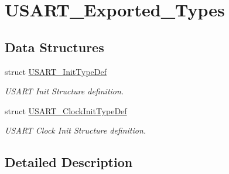 \hypertarget{group___u_s_a_r_t___exported___types}{}\section{U\+S\+A\+R\+T\+\_\+\+Exported\+\_\+\+Types}
\label{group___u_s_a_r_t___exported___types}
\subsection*{Data Structures}
\begin{DoxyCompactItemize}
\item 
struct \mbox{\hyperlink{struct_u_s_a_r_t___init_type_def}{U\+S\+A\+R\+T\+\_\+\+Init\+Type\+Def}}
\begin{DoxyCompactList}\small\item\em U\+S\+A\+RT Init Structure definition. \end{DoxyCompactList}\item 
struct \mbox{\hyperlink{struct_u_s_a_r_t___clock_init_type_def}{U\+S\+A\+R\+T\+\_\+\+Clock\+Init\+Type\+Def}}
\begin{DoxyCompactList}\small\item\em U\+S\+A\+RT Clock Init Structure definition. \end{DoxyCompactList}\end{DoxyCompactItemize}


\subsection{Detailed Description}
